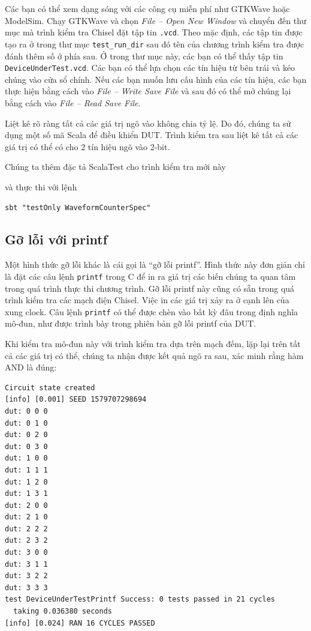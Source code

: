 \documentclass[%
    10pt,
    headinclude, footexclude,
    openright, %
    notitlepage,
    cleardoubleempty,
    headsepline,
    pointlessnumbers,
    bibtotoc, idxtotoc,
    ]{scrbook}
\newcommand{\code}[1]{{\small{\texttt{#1}}}}
\begin{document}
Các bạn có thể xem dạng sóng với các công cụ miễn phí như GTKWave hoặc ModelSim.
Chạy GTKWave và chọn \emph{File -- Open New Window} và chuyển đến thư mục mà trình kiểm tra
Chisel đặt tập tin \code{.vcd}. Theo mặc định, các tập tin được tạo ra ở trong 
thư mục \code{test\_run\_dir} sau đó tên của chương trình kiểm tra được đánh thêm số ở phía sau.
Ở trong thư mục này, các bạn có thể thấy tập tin \code{DeviceUnderTest.vcd}.
Các bạn có thể lựa chọn các tín hiệu từ bên trái và kéo chúng vào cửa sổ chính.
Nếu các bạn muốn lưu cấu hình của các tín hiệu, các bạn thực hiện bằng cách vào 
\emph{File -- Write Save File} và sau đó có thể mở chúng lại bằng cách vào \emph{File -- Read Save File}.

Liệt kê rõ ràng tất cả các giá trị ngõ vào không chia tỷ lệ. Do đó, chúng ta sử dụng một số 
mã Scala để điều khiển DUT. Trình kiểm tra sau liệt kê tất cả các giá trị có thể có cho 
2 tín hiệu ngõ vào 2-bit.


\noindent Chúng ta thêm đặc tả ScalaTest cho trình kiểm tra mới này


\noindent và thực thi với lệnh

\begin{verbatim}
sbt "testOnly WaveformCounterSpec"
\end{verbatim}

\subsection{Gỡ lỗi với printf}

Một hình thức gỡ lỗi khác là cái gọi là ``gỡ lỗi printf''. Hình thức này đơn giản chỉ là đặt 
các câu lệnh \code{printf} trong C để in ra giá trị các biến chúng ta quan tâm trong quá trình 
thực thi chương trình. Gỡ lỗi printf này cũng có sẵn trong quá trình kiểm tra các mạch điện Chisel. 
Việc in các giá trị xảy ra ở cạnh lên của xung clock. Câu lệnh \code{printf} có thể được chèn vào 
bất kỳ đâu trong định nghĩa mô-đun, như được trình bày trong phiên bản gỡ lỗi printf của DUT.


\noindent Khi kiểm tra mô-đun này với trình kiểm tra dựa trên mạch đếm, lặp lại trên tất cả các giá 
trị có thể, chúng ta nhận được kết quả ngõ ra sau, xác minh rằng hàm AND là đúng:

\begin{verbatim}
Circuit state created
[info] [0.001] SEED 1579707298694
dut: 0 0 0
dut: 0 1 0
dut: 0 2 0
dut: 0 3 0
dut: 1 0 0
dut: 1 1 1
dut: 1 2 0
dut: 1 3 1
dut: 2 0 0
dut: 2 1 0
dut: 2 2 2
dut: 2 3 2
dut: 3 0 0
dut: 3 1 1
dut: 3 2 2
dut: 3 3 3
test DeviceUnderTestPrintf Success: 0 tests passed in 21 cycles
  taking 0.036380 seconds
[info] [0.024] RAN 16 CYCLES PASSED
\end{verbatim}
\end{document}
